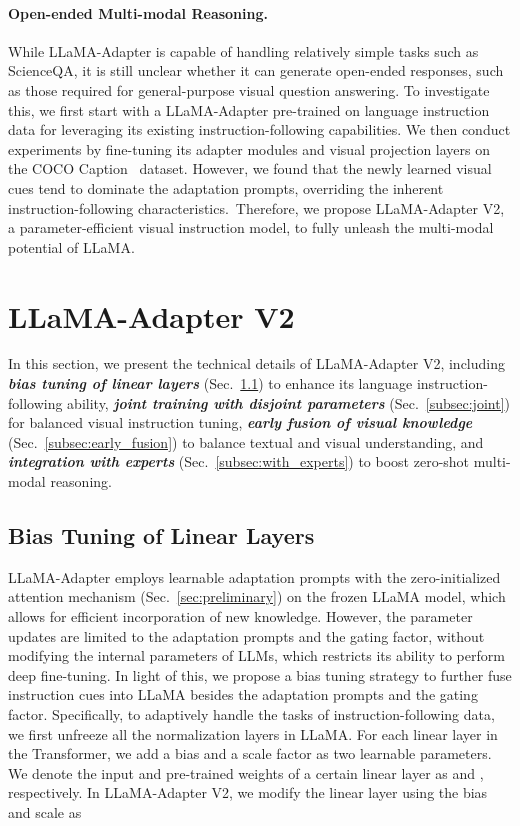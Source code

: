 \documentclass[10pt,twocolumn,letterpaper]{article}
\begin{document}
\paragraph{Open-ended Multi-modal Reasoning.}
While LLaMA-Adapter is capable of handling relatively simple tasks such as ScienceQA, it is still unclear whether it can generate open-ended responses, such as those required for general-purpose visual question answering.
To investigate this, we first start with a LLaMA-Adapter pre-trained on language instruction data for leveraging its existing instruction-following capabilities. 
We then conduct experiments by fine-tuning its adapter modules and visual projection layers on the COCO Caption~\cite{chen2015microsoft} dataset. 
However, we found that the newly learned visual cues tend to dominate the adaptation prompts, overriding the inherent instruction-following characteristics.~Therefore, we propose LLaMA-Adapter V2, a parameter-efficient visual instruction model, to fully unleash the multi-modal potential of LLaMA.


\section{LLaMA-Adapter V2}
\label{sec:llama_adapter_v2}

In this section, we present the technical details of LLaMA-Adapter V2, including \textit{\textbf{bias tuning of linear layers}} (Sec.~\ref{subsec:bias_tuning}) to enhance its language instruction-following ability, \textit{\textbf{joint training with disjoint parameters}} (Sec.~\ref{subsec:joint}) for balanced visual instruction tuning, \textit{\textbf{early fusion of visual knowledge}} (Sec.~\ref{subsec:early_fusion}) to balance textual and visual understanding, and \textit{\textbf{integration with experts}} (Sec.~\ref{subsec:with_experts}) to boost zero-shot multi-modal reasoning.

\subsection{Bias Tuning of Linear Layers}
\label{subsec:bias_tuning}


LLaMA-Adapter employs learnable adaptation prompts with the zero-initialized attention mechanism (Sec.~\ref{sec:preliminary}) on the frozen LLaMA model, which allows for efficient incorporation of new knowledge. However, the parameter updates are limited to the adaptation prompts and the gating factor, without modifying the internal parameters of LLMs, which restricts its ability to perform deep fine-tuning.
In light of this, we propose a bias tuning strategy to further fuse instruction cues into LLaMA besides the adaptation prompts and the gating factor.
Specifically, to adaptively handle the tasks of instruction-following data, we first unfreeze all the normalization layers in LLaMA. For each linear layer in the Transformer, we add a bias and a scale factor as two learnable parameters. We denote the input and pre-trained weights of a certain linear layer as  and , respectively. In LLaMA-Adapter V2, we modify the linear layer using the bias  and scale  as
\end{document}
